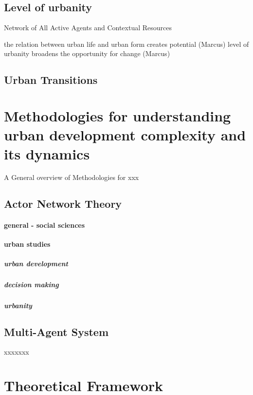 \documentclass[11pt]{report}
\begin{document}
\subsection{Level of urbanity}

Network of All Active Agents and Contextual Resources

the relation between urban life and urban form creates potential (Marcus)
level of urbanity broadens the opportunity for change (Marcus)

\subsection{Urban Transitions}


\section{Methodologies for understanding urban development complexity and its dynamics}

A General overview of Methodologies for xxx

\subsection{Actor Network Theory}

\paragraph{general - social sciences}

\paragraph{urban studies}

\subparagraph{urban development}

\subparagraph{decision making}

\subparagraph{urbanity}


\subsection{Multi-Agent System}

xxxxxxx

\section{Theoretical Framework}


\end{document}
